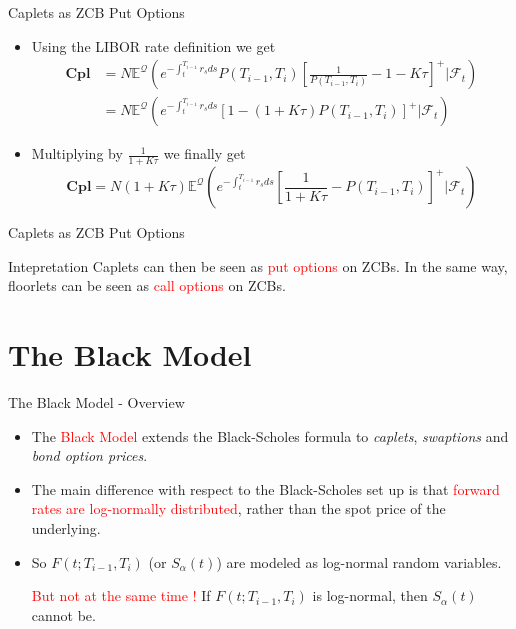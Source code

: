 \documentclass{beamer}
\begin{document}
\begin{frame}{Caplets as ZCB Put Options}
	\begin{itemize}
		\item<1-> Using the LIBOR rate definition we get
		\begin{equation*}
			\begin{aligned}
				\textbf{Cpl} &=N\mathbb{E}^{\mathcal{Q}}\left(e^{-\int_t^{T_{i-1}}r_s ds}P(T_{i-1},T_i)\left[\frac{1}{P(T_{i-1},T_i)}-1-K\tau\right]^+ | \mathcal{F}_t\right) \\
				& = 		N\mathbb{E}^{\mathcal{Q}}\left(e^{-\int_t^{T_{i-1}}r_s ds}\left[1-(1+K\tau)P(T_{i-1},T_i)\right]^+ | \mathcal{F}_t\right)
			\end{aligned}
		\end{equation*}
		\item<2-> Multiplying by $\frac{1}{1+K\tau}$ we finally get
		\begin{equation}
			\textbf{Cpl}=N(1+K\tau)\mathbb{E}^{\mathcal{Q}}\left(e^{-\int_t^{T_{i-1}}r_s ds}\left[\frac{1}{1+K\tau}-P(T_{i-1},T_i)\right]^+ | \mathcal{F}_t\right)
		\end{equation}
	\end{itemize}
\end{frame}

\begin{frame}{Caplets as ZCB Put Options}
	\begin{block}{Intepretation}
		Caplets can then be seen as \textcolor{red}{put options} on ZCBs. In the same way, floorlets can be seen as \textcolor{red}{call options} on ZCBs.
	\end{block}
\end{frame}

\section{The Black Model}
\begin{frame}{The Black Model - Overview}
	\begin{itemize}
		\item The \textcolor{red}{Black Model} extends the Black-Scholes formula to \emph{caplets}, \emph{swaptions} and \emph{bond option prices}. %
		\item The main difference with respect to the Black-Scholes set up is that \textcolor{red}{forward rates are log-normally distributed}, rather than the spot price of the underlying.
		\item So $F(t;T_{i-1},T_i)$ (or $S_\alpha(t)$) are modeled as log-normal random variables. 
		
		\textcolor{red}{But not at the same time !} If $F(t;T_{i-1},T_i)$ is log-normal, then $S_\alpha(t)$ cannot be.
		
	\end{itemize}
\end{frame}
\end{document}
